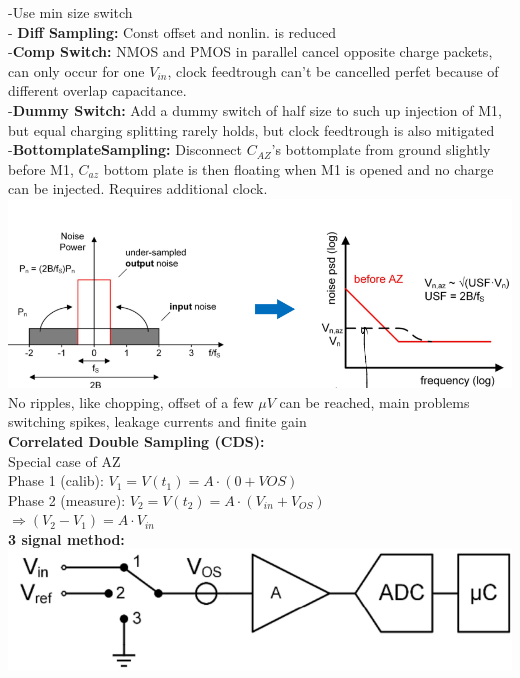 \documentclass[5pt]{article}
\begin{document}
\begin{multicols*}{4}
-Use min size switch\\
- \textbf{Diff Sampling:} Const offset and nonlin. is reduced\\
-\textbf{Comp Switch:} NMOS and PMOS in parallel cancel opposite charge packets, can only occur for one $ V_{in} $, clock feedtrough can't be cancelled perfet because of different overlap capacitance.\\
-\textbf{Dummy Switch:} Add a dummy switch of half size to such up injection of M1, but equal charging splitting rarely holds, but clock feedtrough is also mitigated\\
-\textbf{BottomplateSampling:} Disconnect $ C_{AZ} $'s bottomplate from ground slightly before M1, $ C_{az} $ bottom plate is then floating when M1 is opened and no charge can be injected. Requires additional clock.\\
\includegraphics[width=\columnwidth]{images/az_outcome.png}\\
No ripples, like chopping, offset of a few $ \mu V $ can be reached, main problems switching spikes, leakage currents and finite gain\\
\textbf{Correlated Double Sampling (CDS):}\\
Special case of AZ\\
Phase 1 (calib): $ V_1 = V(t_1) = A \cdot (0 + VOS) $\\
Phase 2 (measure): $ V_2 = V(t_2) = A \cdot (V_{in} + V_{OS}) $\\
$\Rightarrow (V_2 - V_1 ) = A \cdot V_{in} $\\
\textbf{3 signal method:}\\
\includegraphics[width=\columnwidth]{images/3signal_method.png}\\

\end{multicols*}
\end{document}
